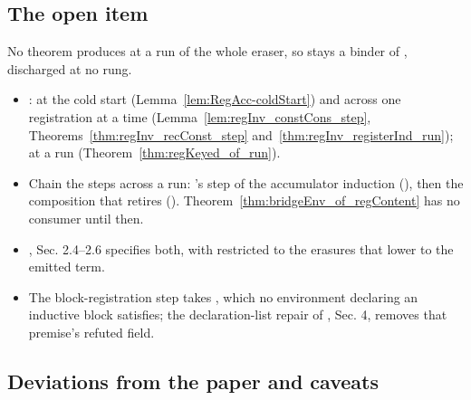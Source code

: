\subsection*{The open item}

\stOpen{}  No theorem produces  at a run of the whole eraser, so 
stays a binder of , discharged at no rung.
\begin{itemize}
\item {} \stProved{}:  at the cold start (Lemma~\ref{lem:RegAcc-coldStart}) and
across one registration at a time (Lemma~\ref{lem:regInv_constCons_step},
Theorems~\ref{thm:regInv_recConst_step} and~\ref{thm:regInv_registerInd_run});  at a run
(Theorem~\ref{thm:regKeyed_of_run}).
\item {} Chain the steps across a run: 's step of the accumulator induction
(), then the composition that retires  ().
Theorem~\ref{thm:bridgeEnv_of_regContent} has no consumer until then.
\item {} , Sec. 2.4--2.6 specifies both, with
 restricted to the erasures that lower to the emitted term.
\item {} The block-registration step takes , which no environment declaring
an inductive block satisfies; the declaration-list repair of , Sec. 4,
removes that premise's refuted field.
\end{itemize}

\subsection*{Deviations from the paper and caveats}

